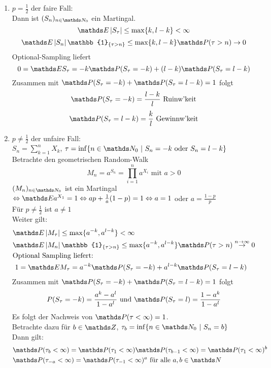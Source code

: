 \begin{enumerate}
	\item $p=\frac{1}{2}$ der faire Fall:\\
	Dann ist $(S_n)_{n\in \N_0}$ ein Martingal.
	\[
	\E\abs{S_\tau}\le \max\{k,l-k\}<\infty
	\]
	\[
	\E\abs{S_n}\mathbb{1}_{\{\tau>n\}}\le \max\{k,l-k\}\Pw(\tau>n)\to 0 
	\]
	Optional-Sampling liefert 
	\[
	0=\E S_\tau= -k\Pw(S_\tau=-k)+(l-k)\Pw(S_\tau=l-k) 
	\]
	Zusammen mit $\Pw(S_\tau=-k)+\Pw(S_\tau=l-k)=1$ folgt
	\[
	\Pw(S_\tau=-k)=\frac{l-k}{l}\text{ Ruinw'keit} 
	\]
	\[
	\Pw(S_\tau=l-k)=\frac{k}{l}\text{ Gewinnw'keit} 
	\]
	\item $p\not= \frac{1}{2}$ der unfaire Fall:\\
	$S_n=\sum_{k=1}^{n}X_k$, $\tau=\inf\{n\in \N_0~|~S_n=-k\text{ oder }S_n=l-k\}$\\
	Betrachte den geometrischen Random-Walk 
	\[
	M_n=a^{S_n}=\prod_{i=1}^{n}a^{X_i}\text{ mit }a>0 
	\]
	$(M_n)_{n\in \N_0}$ ist ein Martingal $\Leftrightarrow \E a^{X_1}=1 \Leftrightarrow ap+\frac{1}{a}(1-p)=1 \Leftrightarrow a=1$ oder $a=\frac{1-p}{p}$\\
	Für $p\not= \frac{1}{2}$ ist $a\not=1$\\
	Weiter gilt:
	\begin{equation*}
	\begin{aligned}
		&\E \abs{M_\tau}\le \max\{a^{-k},a^{l-k}\}<\infty\\
		&\E\abs{M_n}\mathbb{1}_{\{\tau>n\}}\le \max\{a^{-k},a^{l-k}\}\Pw(\tau>n)\stackrel{n\to\infty}{\to}0\\
		&\text{Optional Sampling liefert: }\\
		&~1=\E M_\tau=a^{-k}\Pw(S_\tau=-k)+a^{l-k}\Pw(S_\tau=l-k)
	\end{aligned}
	\end{equation*}
	Zusammen mit $\Pw(S_\tau=-k)+\Pw(S_\tau=l-k)=1$ folgt
	\[
	P(S_\tau=-k)=\frac{a^k-a^l}{1-a^l}\text{ und } \Pw(S_\tau=l)=\frac{1-a^k}{1-a^l}
	\]
	Es folgt der Nachweis von $\Pw(\tau<\infty)=1$.\\
	Betrachte dazu für $b\in \Z$, $\tau_b=\inf\{n\in \N_0~|~S_n=b\}$\\
	Dann gilt:
	\begin{equation*}
	\begin{aligned}
		&\Pw(\tau_b<\infty)=\Pw(\tau_1<\infty)\Pw(\tau_{b-1}<\infty)=\Pw(\tau_1<\infty)^b\\
		&\Pw(\tau_{-a}<\infty)=\Pw(\tau_{-1}<\infty)^a \text{ für alle }a,b\in \N
	\end{aligned}
	\end{equation*}

\end{enumerate}
